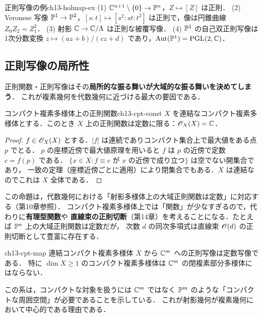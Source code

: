 \begin{myex}{正則写像の例}{ch13-holmap-ex}
(1) $\mathbb{C}^{n+1}\setminus\{0\}\to\mathbb{P}^n$，$Z\mapsto[Z]$ は正則．
(2) Veronese 写像 $\mathbb{P}^1\to\mathbb{P}^2$，$[s:t]\mapsto[s^2:st:t^2]$ は正則で，像は円錐曲線 $Z_0Z_2=Z_1^2$．
(3) 射影 $\mathbb{C}\to\mathbb{C}/\Lambda$ は正則な被覆写像．
(4) $\mathbb{P}^1$ の自己双正則写像は1次分数変換 $z\mapsto (az+b)/(cz+d)$ であり，$\operatorname{Aut}(\mathbb{P}^1)=\operatorname{PGL}(2,\mathbb{C})$．
\end{myex}

\subsection{正則写像の局所性}

正則関数・正則写像はその\textbf{局所的な振る舞いが大域的な振る舞いを決めてしまう}．
これが複素幾何を代数幾何に近づける最大の要因である．

\begin{myprop}{コンパクト複素多様体上の正則関数}{ch13-cpt-const}
$X$ を連結なコンパクト複素多様体とする．このとき $X$ 上の正則関数は定数に限る：$\mathscr{O}_X(X)=\mathbb{C}$．
\end{myprop}

\begin{proof}
$f\in\mathscr{O}_X(X)$ とする．$|f|$ は連続でありコンパクト集合上で最大値をある点 $p$ でとる．
$p$ の座標近傍で最大値原理を用いると $f$ は $p$ の近傍で定数 $c=f(p)$ である．
$\{x\in X: f\equiv c \text{ が } x \text{ の近傍で成り立つ}\}$ は空でない開集合であり，
一致の定理（座標近傍ごとに適用）により閉集合でもある．$X$ は連結なのでこれは $X$ 全体である．
\end{proof}

この命題は，代数幾何における「射影多様体上の大域正則関数は定数」に対応する（第10章参照）．
コンパクト複素多様体上では「関数」が少なすぎるので，代わりに\textbf{有理型関数}や
\textbf{直線束の正則切断}（第14章）を考えることになる．たとえば $\mathbb{P}^n$ 上の大域正則関数は定数だが，
次数 $d$ の同次多項式は直線束 $\mathscr{O}(d)$ の正則切断として豊富に存在する．

\begin{mycor}{}{ch13-cpt-map}
連結コンパクト複素多様体 $X$ から $\mathbb{C}^m$ への正則写像は定数写像である．
特に $\dim X\geq1$ のコンパクト複素多様体は $\mathbb{C}^m$ の閉複素部分多様体にはならない．
\end{mycor}

この系は，コンパクトな対象を扱うには $\mathbb{C}^m$ ではなく $\mathbb{P}^m$ のような「コンパクトな周囲空間」が必要であることを示している．
これが射影幾何が複素幾何において中心的である理由である．

